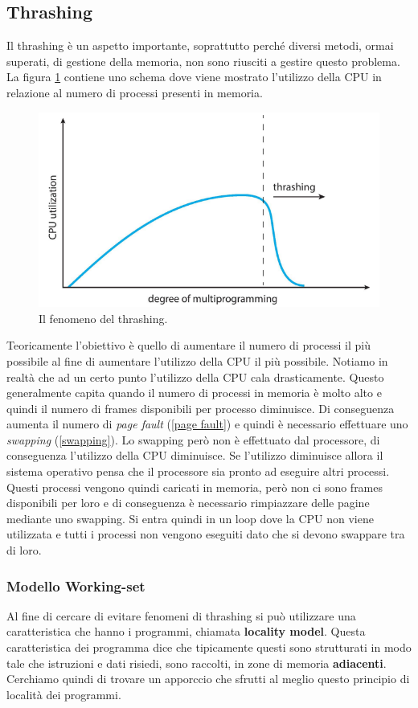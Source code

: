 % 
\subsection{Thrashing}
Il thrashing è un aspetto importante, soprattutto perché diversi metodi, ormai superati, di gestione della memoria, non sono riusciti a gestire questo problema. La figura \ref{fig:thrashing} contiene uno schema dove viene mostrato l'utilizzo della CPU in relazione al numero di processi presenti in memoria.
\begin{figure}[h]
    \centering
    \includegraphics[width = .5\textwidth]{../res/imgs/virtual memory/thrashing.png}
    \caption{Il fenomeno del thrashing.}
    \label{fig:thrashing}
\end{figure}
Teoricamente l'obiettivo è quello di aumentare il numero di processi il più possibile al fine di aumentare l'utilizzo della CPU il più possibile. Notiamo in realtà che ad un certo punto l'utilizzo della CPU cala drasticamente. Questo generalmente capita quando il numero di processi in memoria è molto alto e quindi il numero di frames disponibili per processo diminuisce. Di conseguenza aumenta il numero di \textit{page fault} (\ref{page fault}) e quindi è necessario effettuare uno \textit{swapping} (\ref{swapping}). Lo swapping però non è effettuato dal processore, di conseguenza l'utilizzo della CPU diminuisce. Se l'utilizzo diminuisce allora il sistema operativo pensa che il processore sia pronto ad eseguire altri processi. Questi processi vengono quindi caricati in memoria, però non ci sono frames disponibili per loro e di conseguenza è necessario rimpiazzare delle pagine mediante uno swapping. Si entra quindi in un loop dove la CPU non viene utilizzata e tutti i processi non vengono eseguiti dato che si devono swappare tra di loro. 

% 
\subsubsection{Modello Working-set}
Al fine di cercare di evitare fenomeni di thrashing si può utilizzare una caratteristica che hanno i programmi, chiamata \textbf{locality model}. Questa caratteristica dei programma dice che tipicamente questi sono strutturati in modo tale che istruzioni e dati risiedi, sono raccolti, in zone di memoria \textbf{adiacenti}. Cerchiamo quindi di trovare un apporccio che sfrutti al meglio questo principio di località dei programmi.


